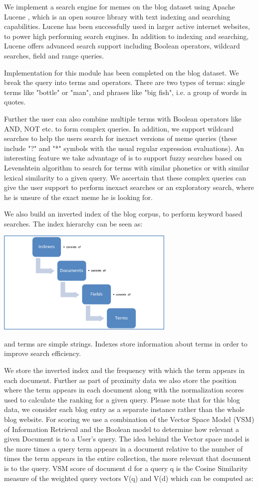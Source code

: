 \documentclass{acm_proc_article-sp}
\begin{document}
We implement a search engine for memes on the blog dataset using Apache Lucene \cite{hatcher2005lucene}, which is an open source library with text indexing and searching capabilities. Lucene has been successfully used in larger active internet websites, to power high performing search engines. In addition to indexing and searching, Lucene offers advanced search support including Boolean operators, wildcard searches, field and range queries.

Implementation for this module has been completed on the blog dataset. We break the query into terms and operators. There are two types of terms: single terms like "bottle" or "man", and phrases like "big fish", i.e. a group of words in quotes.

Further the user can also combine multiple terms with Boolean operators like AND, NOT etc. to form complex queries. In addition, we support wildcard searches to help the users search for inexact versions of meme queries (these include "?" and "*" symbols with the usual regular expression evaluations). An interesting feature we take advantage of is to support fuzzy searches based on Levenshtein algorithm to search for terms with similar phonetics or with similar lexical similarity to a given query. We ascertain that these complex queries can give the user support to perform inexact searches or an exploratory search, where he is unsure of the exact meme he is looking for.

We also build an inverted index of the blog corpus, to perform keyword based searches. The index hierarchy can be seen as:

\includegraphics[width=85mm]{graph.png}

and terms are simple strings. Indexes store information about terms in order to improve search efficiency. 

We store the inverted index and the frequency with which the term appears in each document. Further as part of proximity data we also store the position where the term appears in each document along with the normalization scores used to calculate the ranking for a given query. Please note that for this blog data, we consider each blog entry as a separate instance rather than the whole blog website.
For scoring we use a combination of the Vector Space Model (VSM) of Information Retrieval \cite{baeza1999modern} and the Boolean model to determine how relevant a given Document is to a User's query. The idea behind the Vector space model is the more times a query term appears in a document relative to the number of times the term appears in the entire collection, the more relevant that document is to the query. VSM score of document d for a query q is the Cosine Similarity measure of the weighted query vectors V(q) and V(d) which can be computed as: 
\end{document}
